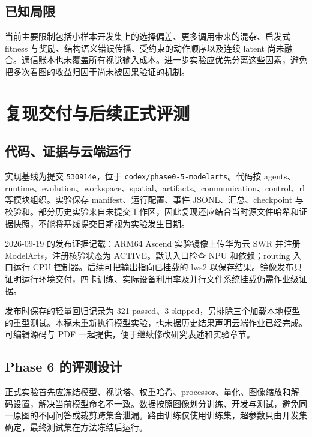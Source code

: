 \documentclass[UTF8,a4paper,zihao=5,fontset=fandol]{ctexart}
\newcommand{\code}[1]{\texttt{\small #1}}
\begin{document}
\subsection{已知局限}
当前主要限制包括小样本开发集上的选择偏差、更多调用带来的混杂、启发式 fitness 与奖励、结构语义错误传播、受约束的动作顺序以及连续 latent 尚未融合。通信账本也未覆盖所有视觉输入成本。进一步实验应优先分离这些因素，避免把多次看图的收益归因于尚未被因果验证的机制。

\newpage
\section{复现交付与后续正式评测}
\subsection{代码、证据与云端运行}
实现基线为提交 \code{530914e}，位于 \code{codex/phase0-5-modelarts}。代码按 agents、runtime、evolution、workspace、spatial、artifacts、communication、control、rl 等模块组织。实验保存 manifest、运行配置、事件 JSONL、汇总、checkpoint 与校验和。部分历史实验来自未提交工作区，因此复现还应结合当时源文件哈希和证据快照，不能将基线提交日期视为实验发生日期。

2026-09-19 的发布证据记载：ARM64 Ascend 实验镜像上传华为云 SWR 并注册 ModelArts，注册核验状态为 ACTIVE。默认入口检查 NPU 和依赖；routing 入口运行 CPU 控制器。后续可把输出指向已挂载的 lws2 以保存结果。镜像发布只证明运行环境交付，四卡训练、实际设备利用率及并行文件系统挂载仍需作业级证据。

发布时保存的轻量回归记录为 321 passed、3 skipped，另排除三个加载本地模型的重型测试。本稿未重新执行模型实验，也未据历史结果声明云端作业已经完成。可编辑源码与 PDF 一起提供，便于继续修改研究表述和实验章节。

\subsection{Phase 6 的评测设计}
正式实验首先应冻结模型、视觉塔、权重哈希、processor、量化、图像缩放和解码设置，解决当前模型命名不一致。数据按照图像划分训练、开发与测试，避免同一原图的不同问答或裁剪跨集合泄漏。路由训练仅使用训练集，超参数只由开发集确定，最终测试集在方法冻结后运行。
\end{document}
